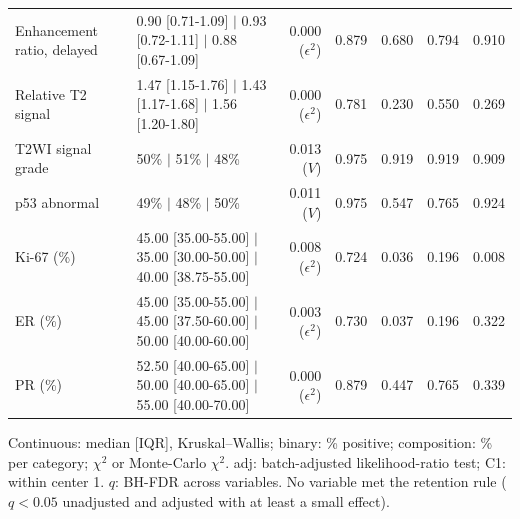 \begin{table}[t]
{\begin{tabular}{llrrrrr}
Enhancement ratio, delayed & 0.90 [0.71-1.09] $|$ 0.93 [0.72-1.11] $|$ 0.88 [0.67-1.09] & 0.000 ($\epsilon^2$) & 0.879 & 0.680 & 0.794 & 0.910 \\
Relative T2 signal & 1.47 [1.15-1.76] $|$ 1.43 [1.17-1.68] $|$ 1.56 [1.20-1.80] & 0.000 ($\epsilon^2$) & 0.781 & 0.230 & 0.550 & 0.269 \\
T2WI signal grade & 50\% $|$ 51\% $|$ 48\% & 0.013 ($V$) & 0.975 & 0.919 & 0.919 & 0.909 \\
p53 abnormal & 49\% $|$ 48\% $|$ 50\% & 0.011 ($V$) & 0.975 & 0.547 & 0.765 & 0.924 \\
Ki-67 (\%) & 45.00 [35.00-55.00] $|$ 35.00 [30.00-50.00] $|$ 40.00 [38.75-55.00] & 0.008 ($\epsilon^2$) & 0.724 & 0.036 & 0.196 & 0.008 \\
ER (\%) & 45.00 [35.00-55.00] $|$ 45.00 [37.50-60.00] $|$ 50.00 [40.00-60.00] & 0.003 ($\epsilon^2$) & 0.730 & 0.037 & 0.196 & 0.322 \\
PR (\%) & 52.50 [40.00-65.00] $|$ 50.00 [40.00-65.00] $|$ 55.00 [40.00-70.00] & 0.000 ($\epsilon^2$) & 0.879 & 0.447 & 0.765 & 0.339 \\
\bottomrule
\end{tabular}}
\par\smallskip\parbox{0.95\linewidth}{\footnotesize Continuous: median [IQR], Kruskal--Wallis; binary: \% positive; composition: \% per category; $\chi^2$ or Monte-Carlo $\chi^2$. adj: batch-adjusted likelihood-ratio test; C1: within center 1. $q$: BH-FDR across variables. No variable met the retention rule ($q<0.05$ unadjusted and adjusted with at least a small effect).}
\end{table}
